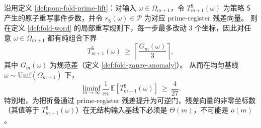 \begin{corollary}\label{cor:pom-prime-residual-linear-lb}
沿用定义 \ref{def:pom-fold-prime-lift}：对输入 $\omega\in\Omega_{m+1}$，令 $T_{m+1}^{\mathsf S}(\omega)$ 为策略 $\mathsf S$ 产生的原子重写事件步数，并令 $r_{\mathsf S}(\omega)\in\mathcal P$ 为对应 prime-register 残差向量。
则在定义 \ref{def:fold-word} 的局部重写规则下，每一步最多改动 $3$ 个坐标，因此对任意 $\omega\in\Omega_{m+1}$ 都有纯组合下界
\[
T_{m+1}^{\mathsf S}(\omega)\ \ge\ \left\lceil \frac{G_m(\omega)}{3}\right\rceil ,
\]
其中 $G_m(\omega)$ 为规范差（定义 \ref{def:fold-gauge-anomaly}）。
从而在均匀基线 $\omega\sim\mathrm{Unif}(\Omega_{m+1})$ 下，
\[
\liminf_{m\to\infty}\frac{1}{m}\,\mathbb E\!\left[T_{m+1}^{\mathsf S}(\omega)\right]\ \ge\ \frac{4}{27}.
\]
特别地，为把折叠通过 prime-register 残差提升为可逆门，残差向量的非零坐标数（其值等于 $T_{m+1}^{\mathsf S}(\omega)$）在无结构输入基线下必须是 $\Theta(m)$，不可能是 $o(m)$。
\end{corollary}
